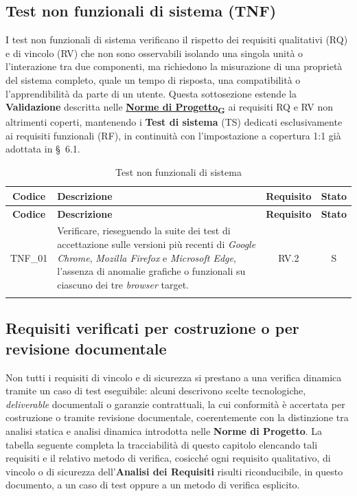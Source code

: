 \documentclass[12pt, a4paper]{article}
\newcommand{\urlglossario}{https://skynetunigroup.github.io/Code_Guardian/Documentazione/PB/glossario_v2.0.0.pdf} %
\newcommand{\glo}[2]{\href{\urlglossario\#nameddest=#2}{#1\textsubscript{G}}}
\newlength{\LargColVal} %
\begin{document}
\subsection{Test non funzionali di sistema (TNF)}
I test non funzionali di sistema verificano il rispetto dei requisiti qualitativi (RQ) e di vincolo (RV) che non sono osservabili isolando una singola unità o l'interazione tra due componenti, ma richiedono la misurazione di una proprietà del sistema completo, quale un tempo di risposta, una compatibilità o l'apprendibilità da parte di un utente. Questa sottosezione estende la \textbf{Validazione} descritta nelle \textbf{\glo{Norme di Progetto}{norme-di-progetto}} ai requisiti RQ e RV non altrimenti coperti, mantenendo i \textbf{Test di sistema} (TS) dedicati esclusivamente ai requisiti funzionali (RF), in continuità con l'impostazione a copertura 1:1 già adottata in \S~6.1.

\renewcommand{\arraystretch}{1.3}
\begin{xltabular}{\textwidth}{|c|X|C{\LargColVal}|C{\LargColVal}|}

    \hline
    \textbf{Codice} & \textbf{Descrizione} & \textbf{Requisito} & \textbf{Stato} \\ \hline
    \endfirsthead

    \hline
    \textbf{Codice} & \textbf{Descrizione} & \textbf{Requisito} & \textbf{Stato} \\ \hline
    \endhead

    TNF\_01 & Verificare, rieseguendo la suite dei test di accettazione sulle versioni più recenti di \textit{Google Chrome}, \textit{Mozilla Firefox} e \textit{Microsoft Edge}, l'assenza di anomalie grafiche o funzionali su ciascuno dei tre \textit{browser} target. & RV.2 & S \\ \hline

    \caption{Test non funzionali di sistema}
    \label{tab:test_non_funzionali}
\end{xltabular}

\subsection{Requisiti verificati per costruzione o per revisione documentale}
Non tutti i requisiti di vincolo e di sicurezza si prestano a una verifica dinamica tramite un caso di test eseguibile: alcuni descrivono scelte tecnologiche, \textit{deliverable} documentali o garanzie contrattuali, la cui conformità è accertata per costruzione o tramite revisione documentale, coerentemente con la distinzione tra analisi statica e analisi dinamica introdotta nelle \textbf{Norme di Progetto}. La tabella seguente completa la tracciabilità di questo capitolo elencando tali requisiti e il relativo metodo di verifica, cosicché ogni requisito qualitativo, di vincolo o di sicurezza dell'\textbf{Analisi dei Requisiti} risulti riconducibile, in questo documento, a un caso di test oppure a un metodo di verifica esplicito.
\end{document}

